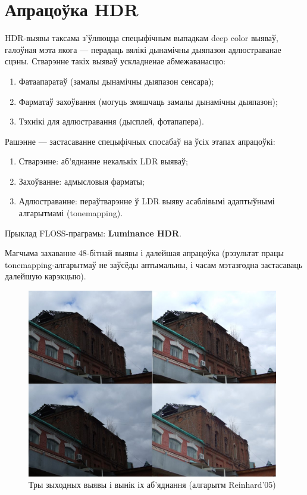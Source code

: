 \documentclass[10pt, a5paper]{article}
\begin{document}
\section*{Апрацоўка HDR}

HDR-выявы таксама з'ўляюцца спецыфічным выпадкам deep color выяваў, галоўная мэта якога --- перадаць вялікі дынамічны дыяпазон адлюстраванае сцэны. Стварэнне такіх выяваў ускладненае абмежаванасцю:
\begin{enumerate}
 \item  Фатаапаратаў (замалы дынамічны дыяпазон сенсара);
\item  Фарматаў захоўвання (могуць змяшчаць замалы дынамічны дыяпазон);
\item  Тэхнікі для адлюстравання (дысплей, фотапапера).
\end{enumerate}
Рашэнне --- застасаванне спецыфічных спосабаў на ўсіх этапах апрацоўкі:
\begin{enumerate}
\item  Стварэнне: аб'яднанне некалькіх LDR выяваў;
\item  Захоўванне: адмысловыя фарматы;
\item  Адлюстраванне: пераўтварэнне ў LDR выяву асаблівымі адаптыўнымі алгарытмамі (tonemapping).
\end{enumerate}

Прыклад FLOSS-праграмы: \textbf{Luminance HDR}.

Магчыма захаванне 48-бітнай выявы і далейшая апрацоўка (рэзультат працы tonemapping-алгарытмаў не заўсёды аптымальны, і часам мэтазгодна застасаваць далейшую карэкцыю).

\begin{figure}[htpb]
 \includegraphics[width=110mm]{LAS_LVEE_2012_HDR.jpg}
 \caption{Тры зыходных выявы і вынік іх аб'яднання (алгарытм Reinhard'05)}
 \label{fig:HDR}
\end{figure}
\end{document}
